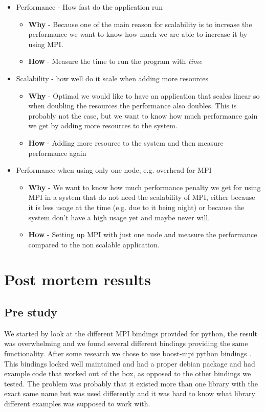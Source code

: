 \documentclass{article}
\begin{document}
\begin{itemize}
\begin{itemize}
{when using MPI it maybe isn't feasible to write applications that
needs to be extended further on with MPI.}
\item{ \textbf{How} - Measure how much work it takes to extend the application with 
		some example feature}
\end{itemize}
\item Performance - How fast do the application run
\begin{itemize}
\item{ \textbf{Why} - Because one of the main reason for scalability is to increase the
 performance we want to know how much we are able to increase it by using MPI. }
\item{ \textbf{How} - Measure the time to run the program with \emph{time}}
\end{itemize}
\item Scalability - how well do it scale when adding more resources
\begin{itemize}
\item{ \textbf{Why} - Optimal we would like to have an application that scales linear
 so when doubling the resources the performance also doubles. This is probably 
 not the case, but we want to know how much performance gain we get by adding
 more resources to the system. }
\item{ \textbf{How} - Adding more resource to the system and then measure performance
 again}
\end{itemize}
\item Performance when using only one node, e.g. overhead for MPI
\begin{itemize}
\item{ \textbf{Why} - We want to know how much performance penalty we get for using
MPI in a system that do not need the scalability of MPI, either because it is 
less usage at the time (e.g. due to it being night) or because the system
don't have a high usage yet and maybe never will.}
\item{ \textbf{How} - Setting up MPI with just one node and measure the performance
 compared to the non scalable application. }
\end{itemize}
\end{itemize}


\section{Post mortem results}
\subsection{Pre study}
We started by look at the different MPI bindings provided for python, the result
was overwhelming and we found several different bindings providing the same
functionality. After some research we chose to use boost-mpi python bindings
\cite{boost-mpi}. This bindings locked well maintained and had a proper
debian package and had example code that worked out of the box, as opposed to
the other bindings we tested. The problem was probably that it existed more
than one library with the exact same name but was used differently and it was
hard to know what library different examples was supposed to work with. 
\end{document}
